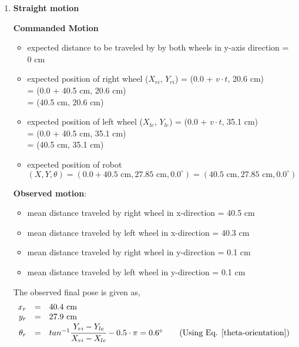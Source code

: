 \begin{enumerate}
\item \textbf{Straight motion}

	\textbf{Commanded Motion}

	\begin{itemize}

		\item expected distance to be traveled by by both wheels in y-axis direction = $0$ cm
	
		\item expected position of right wheel ($X_{ri}$, $Y_{ri}$) = (0.0 + $v\cdot t$, 20.6 cm) \\
			   = (0.0 + 40.5 cm, 20.6 cm)\\
			 = (40.5 cm, 20.6 cm)
	
		\item expected position of left wheel ($X_{le}$, $Y_{le}$) = (0.0 + $v\cdot t$, 35.1 cm) \\
		= (0.0 + 40.5 cm, 35.1 cm)\\
		= (40.5 cm, 35.1 cm)
	
		\item expected position of robot $(X, Y, \theta) = (0.0 + 40.5 \text{ cm}, 27.85 \text{ cm}, 0.0^{\circ}) = (40.5 \text{ cm}, 27.85 \text{ cm}, 0.0^{\circ})$
\end{itemize}
	
\textbf{Observed motion}:
\begin{itemize}
\item mean distance traveled by right wheel in x-direction = 40.5 cm
		
\item mean distance traveled by left wheel in x-direction = 40.3 cm 
		
\item mean distance traveled by right wheel in y-direction = 0.1 cm 
		
\item mean distance traveled by left wheel in y-direction = 0.1 cm 

\end{itemize}

The observed final pose is given as,
\begin{equation}
\begin{array}{rcl}
x_r &=& 40.4 \text{ cm} \\
y_r &=& 27.9 \text{ cm} \\
\theta_r &=& tan^{-1}\cfrac{Y_{ri} - Y_{le}}{X_{ri} - X_{le}} - 0.5\cdot{\pi} = 0.6^{\circ} \qquad \text{(Using Eq. \ref{theta-orientation})}
\end{array}
\end{equation}



\end{enumerate}
